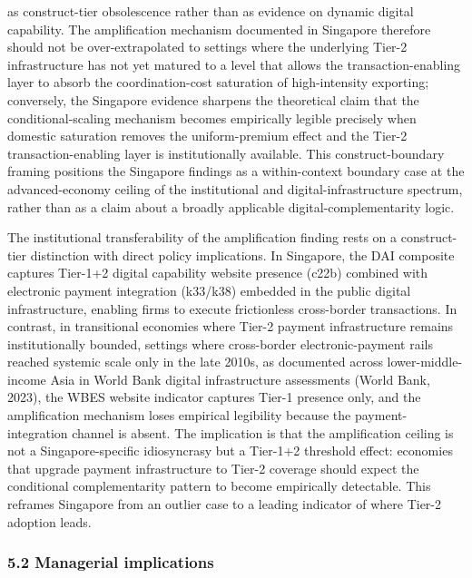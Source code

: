 \documentclass[
  12pt,a4paper]{article}
\begin{document}
as construct-tier obsolescence rather than as evidence on dynamic
digital capability. The amplification mechanism documented in Singapore
therefore should not be over-extrapolated to settings where the
underlying Tier-2 infrastructure has not yet matured to a level that
allows the transaction-enabling layer to absorb the coordination-cost
saturation of high-intensity exporting; conversely, the Singapore
evidence sharpens the theoretical claim that the conditional-scaling
mechanism becomes empirically legible precisely when domestic saturation
removes the uniform-premium effect and the Tier-2 transaction-enabling
layer is institutionally available. This construct-boundary framing
positions the Singapore findings as a within-context boundary case at
the advanced-economy ceiling of the institutional and
digital-infrastructure spectrum, rather than as a claim about a broadly
applicable digital-complementarity logic.

The institutional transferability of the amplification finding rests on
a construct-tier distinction with direct policy implications. In
Singapore, the DAI composite captures Tier-1+2 digital capability
website presence (c22b) combined with electronic payment integration
(k33/k38) embedded in the public digital infrastructure, enabling firms
to execute frictionless cross-border transactions. In contrast, in
transitional economies where Tier-2 payment infrastructure remains
institutionally bounded, settings where cross-border electronic-payment
rails reached systemic scale only in the late 2010s, as documented
across lower-middle-income Asia in World Bank digital infrastructure
assessments (World Bank, 2023), the WBES website indicator captures
Tier-1 presence only, and the amplification mechanism loses empirical
legibility because the payment-integration channel is absent. The
implication is that the amplification ceiling is not a
Singapore-specific idiosyncrasy but a Tier-1+2 threshold effect:
economies that upgrade payment infrastructure to Tier-2 coverage should
expect the conditional complementarity pattern to become empirically
detectable. This reframes Singapore from an outlier case to a leading
indicator of where Tier-2 adoption leads.

\hypertarget{managerial-implications}{%
\subsubsection{5.2 Managerial
implications}\label{managerial-implications}}
\end{document}
